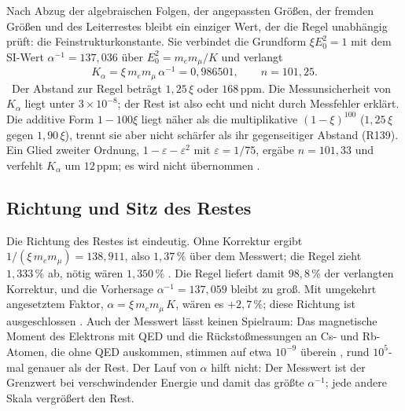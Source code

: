 Nach Abzug der algebraischen Folgen, der angepassten Größen, der fremden Größen und des Leiterrestes
bleibt ein einziger Wert, der die Regel unabhängig prüft: die Feinstrukturkonstante. Sie verbindet
die Grundform $\xi E_0^2=1$ mit dem SI-Wert $\alpha^{-1}=137{,}036$ über $E_0^2=m_em_\mu/K$ und
verlangt
\begin{equation}
  K_\alpha=\xi\,m_em_\mu\,\alpha^{-1}=0{,}986501,\qquad n=101{,}25 .
\end{equation}
\KM\ Der Abstand zur Regel beträgt $1{,}25\,\xi$ oder $168$\,ppm. Die Messunsicherheit von $K_\alpha$
liegt unter $3\times10^{-8}$; der Rest ist also echt und nicht durch Messfehler erklärt. Die additive
Form $1-100\xi$ liegt näher als die multiplikative $(1-\xi)^{100}$ ($1{,}25\,\xi$ gegen
$1{,}90\,\xi$), trennt sie aber nicht schärfer als ihr gegenseitiger Abstand (R139). Ein Glied
zweiter Ordnung, $1-\varepsilon-\varepsilon^2$ mit $\varepsilon=1/75$, ergäbe $n=101{,}33$ und
verfehlt $K_\alpha$ um $12$\,ppm; es wird nicht übernommen \SM.

\subsection*{Richtung und Sitz des Restes}

Die Richtung des Restes ist eindeutig. Ohne Korrektur ergibt $1/(\xi\,m_em_\mu)=138{,}911$, also
$1{,}37\,\%$ über dem Messwert; die Regel zieht $1{,}333\,\%$ ab, nötig wären $1{,}350\,\%$ \KM. Die
Regel liefert damit $98{,}8\,\%$ der verlangten Korrektur, und die Vorhersage $\alpha^{-1}=137{,}059$
bleibt zu groß. Mit umgekehrt angesetztem Faktor, $\alpha=\xi\,m_em_\mu\,K$, wären es $+2{,}7\,\%$;
diese Richtung ist ausgeschlossen \XM. Auch der Messwert lässt keinen Spielraum: Das magnetische
Moment des Elektrons mit QED und die Rückstoßmessungen an Cs- und Rb-Atomen, die ohne QED auskommen,
stimmen auf etwa $10^{-9}$ überein \QM, rund $10^5$-mal genauer als der Rest. Der Lauf von $\alpha$
hilft nicht: Der Messwert ist der Grenzwert bei verschwindender Energie und damit das größte
$\alpha^{-1}$; jede andere Skala vergrößert den Rest.

